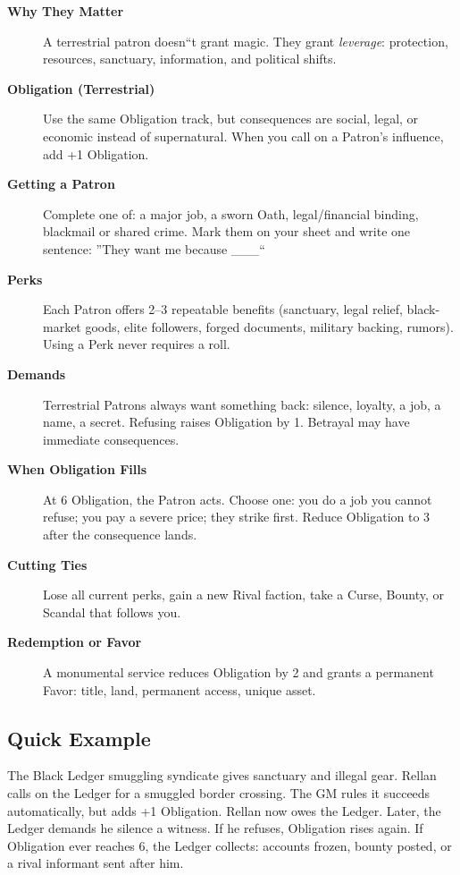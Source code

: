 \begin{description}
    \item[\textbf{Why They Matter}] A terrestrial patron doesn``t grant magic. They grant \emph{leverage}: protection, resources, sanctuary, information, and political shifts.
    \item[\textbf{Obligation (Terrestrial)}] Use the same Obligation track, but consequences are social, legal, or economic instead of supernatural. When you call on a Patron's influence, add +1 Obligation.
    \item[\textbf{Getting a Patron}] Complete one of: a major job, a sworn Oath, legal/financial binding, blackmail or shared crime. Mark them on your sheet and write one sentence: ''They want me because \_\_\_``
    \item[\textbf{Perks}] Each Patron offers 2--3 repeatable benefits (sanctuary, legal relief, black-market goods, elite followers, forged documents, military backing, rumors). Using a Perk never requires a roll.
    \item[\textbf{Demands}] Terrestrial Patrons always want something back: silence, loyalty, a job, a name, a secret. Refusing raises Obligation by 1. Betrayal may have immediate consequences.
    \item[\textbf{When Obligation Fills}] At 6 Obligation, the Patron acts. Choose one: you do a job you cannot refuse; you pay a severe price; they strike first. Reduce Obligation to 3 after the consequence lands.
    \item[\textbf{Cutting Ties}] Lose all current perks, gain a new Rival faction, take a Curse, Bounty, or Scandal that follows you.
    \item[\textbf{Redemption or Favor}] A monumental service reduces Obligation by 2 and grants a permanent Favor: title, land, permanent access, unique asset.
\end{description}

\subsection*{Quick Example}
The Black Ledger smuggling syndicate gives sanctuary and illegal gear. Rellan calls on the Ledger for a smuggled border crossing. The GM rules it succeeds automatically, but adds +1 Obligation. Rellan now owes the Ledger. Later, the Ledger demands he silence a witness. If he refuses, Obligation rises again. If Obligation ever reaches 6, the Ledger collects: accounts frozen, bounty posted, or a rival informant sent after him.

